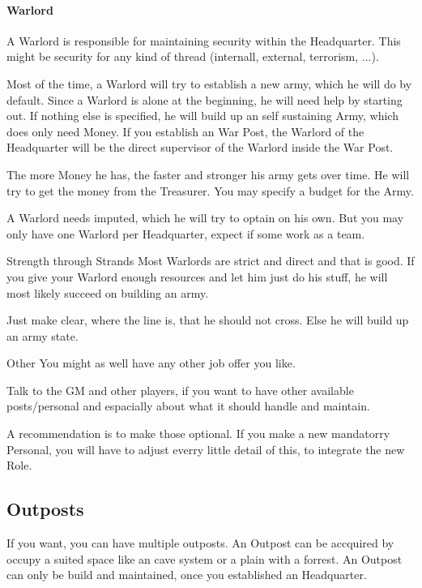 \documentclass[10pt,twoside,twocolumn,openany]{book}
\begin{document}
\paragraph{Warlord}

A Warlord is responsible for maintaining security within the Headquarter. This might be security for any kind of thread (internall, external, terrorism, ...).

Most of the time, a Warlord will try to establish a new army, which he will do by default. Since a Warlord is alone at the beginning, he will need help by starting out. If nothing else is specified, he will build up an self sustaining Army, which does only need Money. If you establish an War Post, the Warlord of the Headquarter will be the direct supervisor of the Warlord inside the War Post.

The more Money he has, the faster and stronger his army gets over time. He will try to get the money from the Treasurer. You may specify a budget for the Army.

A Warlord needs imputed, which he will try to optain on his own. But you may only have one Warlord per Headquarter, expect if some work as a team.

\begin{paperbox}{Strength through Strands}
Most Warlords are strict and direct and that is good. If you give your Warlord enough resources and let him just do his stuff, he will most likely succeed on building an army. 

Just make clear, where the line is, that he should not cross. Else he will build up an army state.
\end{paperbox}

\begin{commentbox}{Other}
You might as well have any other job offer you like.

Talk to the GM and other players, if you want to have other available posts/personal and espacially about what it should handle and maintain.

A recommendation is to make those optional. If you make a new mandatorry Personal, you will have to adjust everry little detail of this, to integrate the new Role.
\end{commentbox}


\subsection{Outposts}

If you want, you can have multiple outposts. An Outpost can be accquired by occupy a suited space like an cave system or a plain with a forrest. An Outpost can only be build and maintained, once you established an Headquarter.
\end{document}
